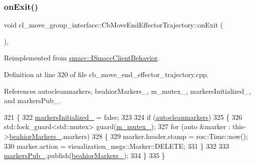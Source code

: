 \subsubsection{\texorpdfstring{on\+Exit()}{onExit()}}
{\footnotesize\ttfamily void cl\+\_\+move\+\_\+group\+\_\+interface\+::\+Cb\+Move\+End\+Effector\+Trajectory\+::on\+Exit (\begin{DoxyParamCaption}{ }\end{DoxyParamCaption})\hspace{0.3cm}{\ttfamily [override]}, {\ttfamily [virtual]}}



Reimplemented from \hyperlink{classsmacc_1_1ISmaccClientBehavior_a36bf771905e3bf750909a15e4215a9b3}{smacc\+::\+I\+Smacc\+Client\+Behavior}.



Definition at line 320 of file cb\+\_\+move\+\_\+end\+\_\+effector\+\_\+trajectory.\+cpp.



References autocleanmarkers, beahior\+Markers\+\_\+, m\+\_\+mutex\+\_\+, markers\+Initialized\+\_\+, and markers\+Pub\+\_\+.


\begin{DoxyCode}
321     \{
322         \hyperlink{classcl__move__group__interface_1_1CbMoveEndEffectorTrajectory_ac140a7f0adfb20f1e2900a5c8cd2ca5b}{markersInitialized\_} = \textcolor{keyword}{false};
323 
324         \textcolor{keywordflow}{if} (\hyperlink{classcl__move__group__interface_1_1CbMoveEndEffectorTrajectory_a790c30b94509dc6f4d0064f6356a04db}{autocleanmarkers})
325         \{
326             std::lock\_guard<std::mutex> guard(\hyperlink{classcl__move__group__interface_1_1CbMoveEndEffectorTrajectory_a2a98ef725cb3fc7f61654d3d6a2066bb}{m\_mutex\_});
327             \textcolor{keywordflow}{for} (\textcolor{keyword}{auto} &marker : this->\hyperlink{classcl__move__group__interface_1_1CbMoveEndEffectorTrajectory_a809fb5385adf27c0a1c8f8136566949c}{beahiorMarkers\_}.markers)
328             \{
329                 marker.header.stamp = ros::Time::now();
330                 marker.action = visualization\_msgs::Marker::DELETE;
331             \}
332 
333             \hyperlink{classcl__move__group__interface_1_1CbMoveEndEffectorTrajectory_aabc2216b2d8625fecd83c5ec69928e63}{markersPub\_}.publish(\hyperlink{classcl__move__group__interface_1_1CbMoveEndEffectorTrajectory_a809fb5385adf27c0a1c8f8136566949c}{beahiorMarkers\_});
334         \}
335     \}
\end{DoxyCode}
\mbox{\label{classcl__move__group__interface_1_1CbMoveEndEffectorTrajectory_aae4797fba54cb3bf371cc67d26a82186}} 
